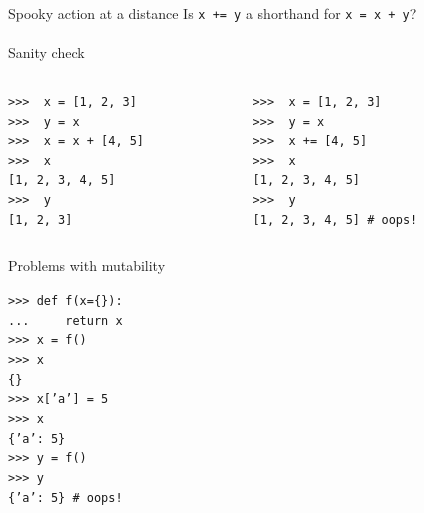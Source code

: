 \documentclass{beamer}
\newcommand{\prompt}{\phantom{}>\phantom{}>\phantom{}>\ }
\begin{document}
\begin{frame}{Spooky action at a distance}
  Is \texttt{x += y} a shorthand for \texttt{x = x + y}? \\
  \ \\
  Sanity check \\ \pause
  \begin{columns}[T] %
    \begin{column}{.48\textwidth}
      \begin{small}
        \texttt{\prompt{} x = [1, 2, 3] \\ \pause
          \prompt{} y = x\\ \pause
          \prompt{} x = x + [4, 5] \\ \pause
          \prompt{} x \\ \pause
          \phantom{} [1, 2, 3, 4, 5] \\ \pause
          \prompt{} y \\ \pause
          \phantom{} [1, 2, 3] \pause
        }
      \end{small}
    \end{column}%
    \hfill%
    \begin{column}{.48\textwidth}
      \begin{small}
        \texttt{\prompt{} x = [1, 2, 3] \\ \pause
          \prompt{} y = x\\ \pause
          \prompt{} x += [4, 5] \\ \pause
          \prompt{} x \\ \pause
          \phantom{} [1, 2, 3, 4, 5] \\ \pause
          \prompt{} y\\ \pause
          \phantom{} [1, 2, 3, 4, 5] \pause \# oops!
        }
      \end{small}
    \end{column}
  \end{columns} 
\end{frame}

\begin{frame}{Problems with mutability}
  \begin{small}
    \texttt{\prompt def f(x=\{\}):\\
      ... \ \ \ \ return x\\ \pause
      \prompt x = f()\\ \pause
      \prompt x \\ \pause
      \{\} \\ \pause
      \prompt x['a'] = 5 \\ \pause
      \prompt x \\ \pause
      \{'a': 5\} \\ \pause
      \prompt y = f()\\ \pause
      \prompt y\\ \pause
      \{'a': 5\} \pause \# oops!
    }
  \end{small}
\end{frame}
\end{document}
